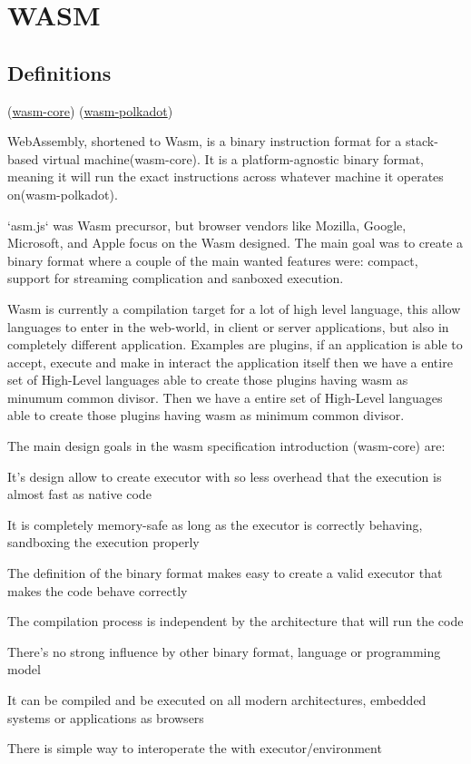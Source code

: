 \documentclass[../main.tex]{subfiles}
\begin{document}
\section{WASM}
\subsection{Definitions}
(\href{https://webassembly.github.io/spec/core/}{wasm-core})
(\href{https://wiki.polkadot.network/docs/learn-wasm}{wasm-polkadot})

WebAssembly, shortened to Wasm, is a binary instruction format for a stack-based virtual machine(wasm-core). It is a platform-agnostic binary format, meaning it will run the exact instructions across whatever machine it operates on(wasm-polkadot).

`asm.js` was Wasm precursor, but browser vendors like Mozilla, Google, Microsoft, and Apple focus on the Wasm designed. The main goal was to create a binary format where a couple of the main wanted features were: compact, support for streaming complication and sanboxed execution.

Wasm is currently a compilation target for a lot of high level language, this allow languages to enter in the web-world, in client or server applications, but also in completely different application. Examples are plugins, if an application is able to accept, execute and make in interact the application itself then we have a entire set of High-Level languages able to create those plugins having wasm as minumum common divisor. Then we have a entire set of High-Level languages able to create those plugins having wasm as minimum common divisor.

The main design goals in the wasm specification introduction (wasm-core) are:
\begin{description} [style=nextline]
  \item[Fast] It's design allow to create executor with so less overhead that the execution is almost fast as native code
  \item[Safe] It is completely memory-safe as long as the executor is correctly behaving, sandboxing the execution properly
  \item[Well-defined] The definition of the binary format makes easy to create a valid executor that makes the code behave correctly
  \item[Hardware-independent] The compilation process is independent by the architecture that will run the code
  \item[Language-independent] There's no strong influence by other binary format, language or programming model
  \item[Platform-independent] It can be compiled and be executed on all modern architectures, embedded systems or applications as browsers
  \item[Open] There is simple way to interoperate the with executor/environment
\end{description}
\end{document}

